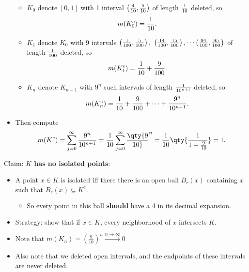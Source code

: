 \begin{solution}
\begin{itemize}
  \begin{itemize}
  \tightlist
  \item
    \(K_0\) denote \([0, 1]\) with 1 interval
    \(\left({4 \over 10}, {5 \over 10} \right)\) of length
    \(1 \over 10\) deleted, so
    \begin{align*}m(K_0^c) = {1\over 10}.\end{align*}
  \item
    \(K_1\) denote \(K_0\) with 9 intervals
    \(\left({1 \over 100}, {5\over 100}\right), ~\left({14 \over 100}, {15 \over 100}\right), \cdots \left({94\over 100}, {95 \over 100}\right)\)
    of length \({1 \over 100}\) deleted, so
    \begin{align*}m(K_1^c) = {1\over 10} + {9 \over 100}.\end{align*}
  \item
    \(K_n\) denote \(K_{n-1}\) with \(9^{n}\) such intervals of length
    \(1 \over 10^{n+1}\) deleted, so
    \begin{align*}m(K_n^c) = {1\over 10} + {9 \over 100} + \cdots + {9^{n} \over 10^{n+1}}.\end{align*}
  \end{itemize}
\item
  Then compute
  \begin{align*}
  m(K^c) 
  = \sum_{j=0}^\infty {9^n \over 10^{n+1} } 
  = {1\over 10} \sum_{j=0}^\infty \qty{9\over 10}^n 
  = {1 \over 10} \qty{ {1 \over 1 - {9 \over 10 } } } 
  = 1.
  \end{align*}
\end{itemize}

Claim: \textbf{\(K\) has no isolated points}:

\begin{itemize}
\item
  A point \(x\in K\) is isolated iff there there is an open ball
  \(B_r(x)\) containing \(x\) such that \(B_r(x) \subsetneq K^c\).

  \begin{itemize}
  \tightlist
  \item
    So every point in this ball \textbf{should} have a 4 in its decimal
    expansion.
  \end{itemize}
\item
  Strategy: show that if \(x\in K\), every neighborhood of \(x\)
  intersects \(K\).
\item
  Note that
  \(m(K_n) = \left( \frac 9 {10} \right)^n \overset{n\to\infty}\to 0\)
\item
  Also note that we deleted open intervals, and the endpoints of these
  intervals are never deleted.


\end{itemize}
\end{solution}
